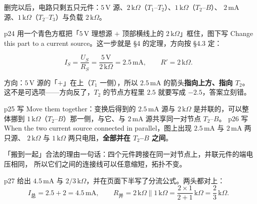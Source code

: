 \documentclass[11pt]{ctexart}
\begin{document}

删完以后，电路只剩五只元件：$5\,\mathrm{V}$ 源、$2\,\mathrm{k}\Omega$（$T_1$--$T_2$）、$1\,\mathrm{k}\Omega$（$T_2$--$B$）、
$2\,\mathrm{mA}$ 源、$1\,\mathrm{k}\Omega$（$T_2$--$T_3$）与负载 $2\,\mathrm{k}\Omega$。


p24 用一个青色方框把「$5\,\mathrm{V}$ 理想源 $+$ 顶部横线上的 $2\,\mathrm{k}\Omega$」框住，图下写
Change this part to a current source。这一步就是 §4 的定理，方向按 §4.3 定：

\[ I_S=\frac{U_S}{R_S}=\frac{5\,\mathrm{V}}{2\,\mathrm{k}\Omega}=2.5\,\mathrm{mA},\qquad R'=2\,\mathrm{k}\Omega . \]

方向：$5\,\mathrm{V}$ 源的「$+$」在上（$T_1$ 一侧），所以 $2.5\,\mathrm{mA}$ 的箭头\textbf{指向上方、指向 $T_2$}。
这不是可选项——方向反了，$T_2$ 的节点方程里 $2.5$ 就要写成 $-2.5$，答案立刻错。



p25 写 Move them together：变换后得到的 $2.5\,\mathrm{mA}$ 源与 $2\,\mathrm{k}\Omega$ 是并联的，可以整体挪到
$1\,\mathrm{k}\Omega$（$T_2$--$B$）那一侧，与它、与 $2\,\mathrm{mA}$ 源共享同一对节点 $T_2$--$B$。
p26 写 When the two current source connected in parallel，图上出现 $2.5\,\mathrm{mA}$ 与 $2\,\mathrm{mA}$ 两只源、
$2\,\mathrm{k}\Omega$ 与 $1\,\mathrm{k}\Omega$ 两只电阻，\textbf{全部并在 $T_2$--$B$ 之间}。

「搬到一起」合法的理由一句话：四个元件跨接在同一对节点上，并联元件的端电压相同，
所以它们之间的连接线可以任意缩短，拓扑不变。


p27 给出 $4.5\,\mathrm{mA}$ 与 $2/3\,\mathrm{k}\Omega$，并在页面下半写了分流公式。两头都对上：
\[ I_{\text{总}}=2.5+2=4.5\,\mathrm{mA},\qquad
R_{\text{并}}=2\,\mathrm{k}\Omega\parallel1\,\mathrm{k}\Omega=\frac{2\times1}{2+1}\,\mathrm{k}\Omega=\frac{2}{3}\,\mathrm{k}\Omega . \]
\end{document}
